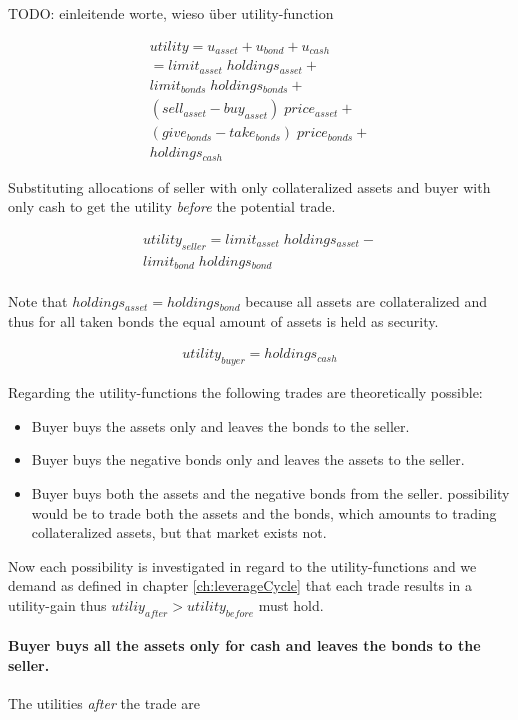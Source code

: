\documentclass[Bachelorarbeit.tex]{subfiles}
\begin{document}
TODO: einleitende worte, wieso über utility-function

\begin{align*}
	utility = u_{asset} + u_{bond} + u_{cash}
	\\ = limit_{asset} \; holdings_{asset} + \\
			limit_{bonds} \; holdings_{bonds} + \\
			(sell_{asset} - buy_{asset}) \; price_{asset} + \\
			(give_{bonds} - take_{bonds}) \; price_{bonds} + \\
			holdings_{cash} 
\end{align*}

Substituting allocations of seller with only collateralized assets and buyer with only cash to get the utility \textit{before} the potential trade.

\begin{align*}
	utility_{seller} = limit_{asset} \; holdings_{asset} - \\
			limit_{bond} \; holdings_{bond} \\
\end{align*}

Note that $holdings_{asset} = holdings_{bond}$ because all assets are collateralized and thus for all taken bonds the equal amount of assets is held as security.

\begin{align*}
	utility_{buyer} = holdings_{cash} 
\end{align*}

Regarding the utility-functions the following trades are theoretically possible:
\begin{itemize}
\item Buyer buys the assets only and leaves the bonds to the seller.
\item Buyer buys the negative bonds only and leaves the assets to the seller.
\item Buyer buys both the assets and the negative bonds from the seller. possibility would be to trade both the assets and the bonds, which amounts to trading collateralized assets, but that market exists not.
\end{itemize}

Now each possibility is investigated in regard to the utility-functions and we demand as defined in chapter \ref{ch:leverageCycle} that each trade results in a utility-gain thus $utiliy_{after} > utility_{before}$ must hold.

\paragraph{Buyer buys all the assets only for cash and leaves the bonds to the seller.}
The utilities \textit{after} the trade are
\end{document}
